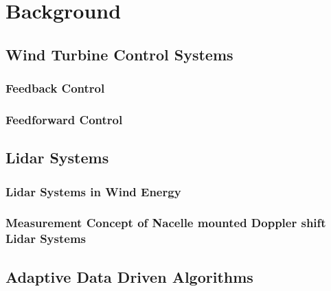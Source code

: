 \chapter{Background} \label{cha:Back}
\section{Wind Turbine Control Systems}\label{sec:ControlSys}




\subsection{Feedback Control}\label{subsec:FB-Contr}









\subsection{Feedforward Control}\label{subsec:FF-Contr}





\section{Lidar Systems}\label{sec:LidarSys}


\subsection{Lidar Systems in Wind Energy}\label{subsec:LidarInWind}


\subsection{Measurement Concept of Nacelle mounted Doppler shift Lidar Systems}\label{subsec:LidarInWindConcept}




\section{Adaptive Data Driven Algorithms}\label{sec:AlgBasics}